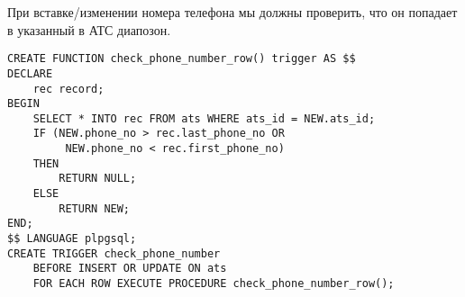 \documentclass{report}
\begin{document}
При вставке/изменении номера телефона мы должны проверить, 
что он попадает в указанный в АТС диапозон.

\begin{lstlisting}
CREATE FUNCTION check_phone_number_row() trigger AS $$
DECLARE
    rec record;
BEGIN
    SELECT * INTO rec FROM ats WHERE ats_id = NEW.ats_id;
    IF (NEW.phone_no > rec.last_phone_no OR
         NEW.phone_no < rec.first_phone_no)
    THEN
        RETURN NULL;
    ELSE
        RETURN NEW;
END;
$$ LANGUAGE plpgsql;
CREATE TRIGGER check_phone_number 
    BEFORE INSERT OR UPDATE ON ats
    FOR EACH ROW EXECUTE PROCEDURE check_phone_number_row();
\end{lstlisting}
\end{document}
